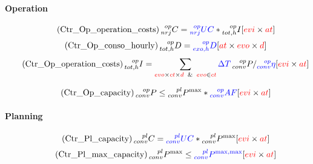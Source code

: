 \documentclass[a4paper,11pt]{article}
\makeatletter
\newcommand{\mathleft}{\@fleqntrue\@mathmargin0pt}
\makeatother
\begin{document}
\paragraph{Operation}
\mathleft
\begin{equation} \tag{Ctr\_Op\_operation\_costs}
    \prescript{op}{nrj}{C} = \textcolor{blue}{\textcolor{blue}{\prescript{op}{nrj}{UC}}}  *  \prescript{op}{tot,h}{I} \hfill [\textcolor{red}{evi}  \times \textcolor{red}{at}]
\label{eq:Ctr_Op_operation_costs}
\end{equation}
\begin{equation} \tag{Ctr\_Op\_conso\_hourly}
    \prescript{op}{tot,h}{D} = \textcolor{blue}{\prescript{op}{exo,h}{D}}  \hfill [\textcolor{red}{at} \times \textcolor{red}{evo} \times \textcolor{red}{d}]
\label{eq:Ctr_Op_conso_hourly}
\end{equation}
\begin{equation} \tag{Ctr\_Op\_operation\_costs}
    \prescript{op}{tot,h}{I} = \sum_{\textcolor{red}{evo} \times \textcolor{red}{ct}\times \textcolor{red}{d} \;\; \& \;\;\textcolor{red}{evo} \in \textcolor{red}{ct}} \textcolor{blue}{\Delta T } \prescript{op}{conv}{P} / \textcolor{blue}{\prescript{op}{conv}{\eta}} \hfill [\textcolor{red}{evi}  \times \textcolor{red}{at}]
\label{eq:Ctr_Op_conso_yearly_1}
\end{equation}


\begin{equation} \tag{Ctr\_Op\_capacity}
   \prescript{op}{conv}{P}  \leq  \prescript{pl}{conv}{P^{\max}} * \textcolor{blue}{\prescript{op}{conv}{AF}} \hfill [\textcolor{red}{evi}  \times \textcolor{red}{at}]
\label{eq:Ctr_Op_capacity}
\end{equation}

\paragraph{Planning}
\begin{equation} \tag{Ctr\_Pl\_capacity}
   \prescript{pl}{conv}{C} = \textcolor{blue}{\prescript{pl}{conv}{UC}}  *  \prescript{pl}{conv}{P^{\max}} \hfill [\textcolor{red}{evi}  \times \textcolor{red}{at}]
\label{eq:Ctr_Pl_capacity}
\end{equation}
\begin{equation} \tag{Ctr\_Pl\_max\_capacity}
   \prescript{pl}{conv}{P^{\max}}  \leq \textcolor{blue}{ \prescript{pl}{conv}{P}^{\max,\max}}    \hfill [\textcolor{red}{evi}  \times \textcolor{red}{at}]
\label{eq:Ctr_Pl_planning_max_capacity}
\end{equation}
\end{document}
